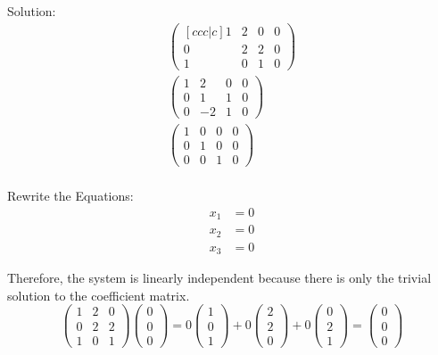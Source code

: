 \noindent
\newline
Solution:
\begin{align}
    \begin{pmatrix}[ccc|c]
        1 & 2 & 0 & 0\\
        0 & 2 & 2 & 0 \\
        1 & 0 & 1 & 0
    \end{pmatrix} \\
    \begin{pmatrix}
        1 & 2 & 0 & 0\\
        0 & 1 & 1 & 0 \\
        0 & -2 & 1 & 0
    \end{pmatrix} \\
    \begin{pmatrix}
        1 & 0 & 0 & 0\\
        0 & 1 & 0 & 0 \\
        0 & 0 & 1 & 0
    \end{pmatrix} \\
\end{align}

\noindent
\newline
Rewrite the Equations:
\begin{align}
    x_1 &= 0 \\
    x_2 &= 0 \\
    x_3 &= 0
\end{align}

\noindent
\newline
Therefore, the system is linearly independent because there is only the trivial solution to the coefficient matrix.
\begin{equation}
    \begin{pmatrix}
        1 & 2 & 0 \\
        0 & 2 & 2 \\
        1 & 0 & 1
    \end{pmatrix} \begin{pmatrix}
        0 \\
        0 \\
        0
    \end{pmatrix} = 0\begin{pmatrix}1 \\ 0 \\ 1\end{pmatrix} + 0\begin{pmatrix}2 \\ 2 \\ 0\end{pmatrix} + 0\begin{pmatrix}0 \\ 2 \\ 1\end{pmatrix} = \begin{pmatrix}0 \\ 0 \\ 0\end{pmatrix}
\end{equation}

